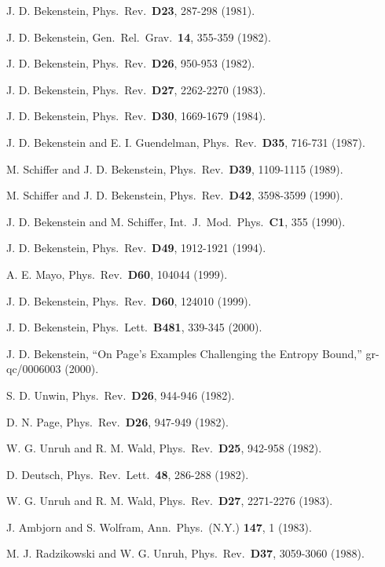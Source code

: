 \documentclass[a4paper,12pt]{article}
\begin{document}
\begin{thebibliography}{99}

J. D. Bekenstein,
Phys.\ Rev.\ {\bf D23}, 287-298 (1981).

J. D. Bekenstein,
Gen.\ Rel.\ Grav.\ {\bf 14}, 355-359 (1982).

J. D. Bekenstein,
Phys.\ Rev.\ {\bf D26}, 950-953 (1982).

J. D. Bekenstein,
Phys.\ Rev.\ {\bf D27}, 2262-2270 (1983).

J. D. Bekenstein,
Phys.\ Rev.\ {\bf D30}, 1669-1679 (1984).

J. D. Bekenstein and E. I. Guendelman,
Phys.\ Rev.\ {\bf D35}, 716-731 (1987).

M. Schiffer and J. D. Bekenstein,
Phys.\ Rev.\ {\bf D39}, 1109-1115 (1989).

M. Schiffer and J. D. Bekenstein,
Phys.\ Rev.\ {\bf D42}, 3598-3599 (1990).

J. D. Bekenstein and M. Schiffer,
Int.\ J.\ Mod.\ Phys.\ {\bf C1}, 355 (1990).

J. D. Bekenstein,
Phys.\ Rev.\ {\bf D49}, 1912-1921 (1994).

A. E. Mayo,
Phys.\ Rev.\ {\bf D60}, 104044 (1999).

J. D. Bekenstein,
Phys.\ Rev.\ {\bf D60}, 124010 (1999).

J. D. Bekenstein,
Phys.\ Lett.\ {\bf B481}, 339-345 (2000).

J. D. Bekenstein,
``On Page's Examples Challenging the Entropy Bound,''
gr-qc/0006003 (2000).

S. D. Unwin,
Phys.\ Rev.\ {\bf D26}, 944-946 (1982).

D. N. Page,
Phys.\ Rev.\ {\bf D26}, 947-949 (1982).

W. G. Unruh and R. M. Wald,
Phys.\ Rev.\ {\bf D25}, 942-958 (1982).

D. Deutsch,
Phys.\ Rev.\ Lett.\ {\bf 48}, 286-288 (1982).

W. G. Unruh and R. M. Wald,
Phys.\ Rev.\ {\bf D27}, 2271-2276 (1983).

J. Ambjorn and S. Wolfram,
Ann.\ Phys.\ (N.Y.) {\bf 147}, 1 (1983).

M. J. Radzikowski and W. G. Unruh, 
Phys.\ Rev.\ {\bf D37}, 3059-3060 (1988).


\end{thebibliography}
\end{document}
